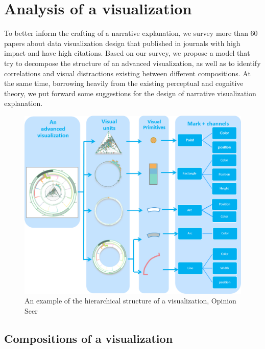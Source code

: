 \documentclass[review,journal]{vgtc}         %
\begin{document}
\section{Analysis of a visualization}
To better inform the crafting of a narrative explanation, we survey more than 60 papers about data visualization design that published in journals with high impact and have high citations. Based on our survey, we propose a model that try to decompose the structure of an advanced visualization, as well as to identify correlations and visual distractions existing between different compositions. At the same time, borrowing heavily from the existing perceptual and cognitive theory, we put forward some suggestions for the design of narrative visualization explanation. 
\par
\begin{figure}
 \centering %
 \includegraphics[width=\columnwidth]{Picture2}
 \caption{An example of the hierarchical structure of a visualization, Opinion Seer\cite{wu_opinionseer:_2010}}
 \label{fig:sample}
\end{figure}
\subsection{Compositions of a visualization}
\end{document}
